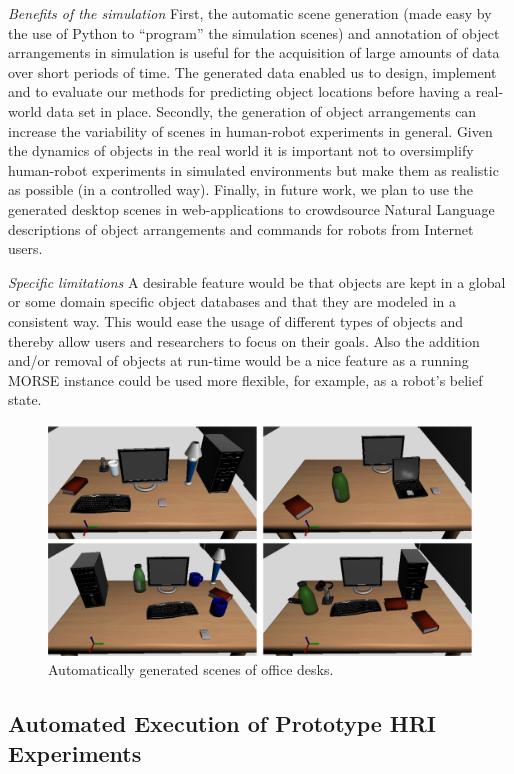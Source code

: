 \documentclass{llncs}
\begin{document}
\emph{Benefits of the simulation} First, the automatic scene generation (made
easy by the use of Python to ``program'' the simulation scenes) and annotation
of object arrangements in simulation is useful for the acquisition of large
amounts of data over short periods of time. The generated data enabled us to
design, implement and to evaluate our methods for predicting object locations
before having a real-world data set in place. Secondly, the generation of object
arrangements can increase the variability of scenes in human-robot experiments
in general. Given the dynamics of objects in the real world it is important not
to oversimplify human-robot experiments in simulated environments but make them
as realistic as possible (in a controlled way). Finally, in future work, we plan
to use the generated desktop scenes in web-applications to crowdsource Natural
Language descriptions of object arrangements and commands for robots from
Internet users.

\emph{Specific limitations} A desirable feature would be that
objects are kept in a global or some domain specific object databases and that
they are modeled in a consistent way. This would ease the usage of different
types of objects and thereby allow users and researchers to focus on their
goals. Also the addition and/or removal of objects at run-time would be a nice
feature as a running MORSE instance could be used more flexible, for example,
as a robot's belief state.

\begin{figure}[t]
  \centering
  \includegraphics[width=.7\columnwidth]{figs/scenes.png}
  \caption{Automatically generated scenes of office desks.}
  \label{fig:simulated-desktop-scenes}
\end{figure}


\subsection{Automated Execution of Prototype HRI Experiments}
\label{sc:ci}
\end{document}
